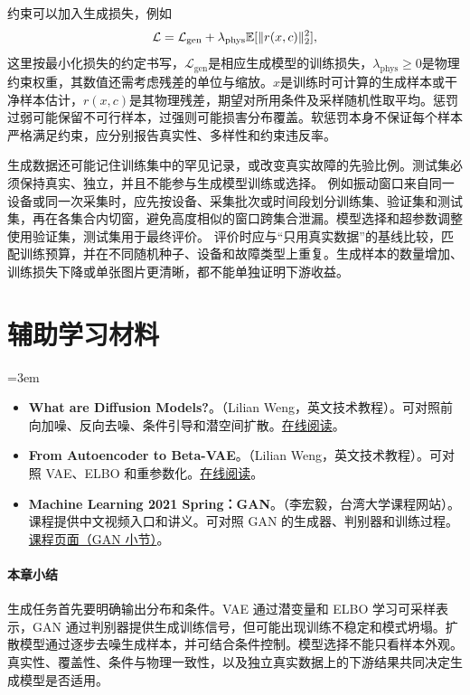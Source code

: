 约束可以加入生成损失，例如
\begin{equation}
\mathcal L=\mathcal L_{\mathrm{gen}}+\lambda_{\mathrm{phys}}\mathbb{E}[\|r(x,c)\|_2^2],
\end{equation}
这里按最小化损失的约定书写，$\mathcal L_{\mathrm{gen}}$是相应生成模型的训练损失，$\lambda_{\mathrm{phys}}\geq0$是物理约束权重，其数值还需考虑残差的单位与缩放。$x$是训练时可计算的生成样本或干净样本估计，$r(x,c)$是其物理残差，期望对所用条件及采样随机性取平均。惩罚过弱可能保留不可行样本，过强则可能损害分布覆盖。软惩罚本身不保证每个样本严格满足约束，应分别报告真实性、多样性和约束违反率。

生成数据还可能记住训练集中的罕见记录，或改变真实故障的先验比例。测试集必须保持真实、独立，并且不能参与生成模型训练或选择。
例如振动窗口来自同一设备或同一次采集时，应先按设备、采集批次或时间段划分训练集、验证集和测试集，再在各集合内切窗，避免高度相似的窗口跨集合泄漏。模型选择和超参数调整使用验证集，测试集用于最终评价。
评价时应与“只用真实数据”的基线比较，匹配训练预算，并在不同随机种子、设备和故障类型上重复。生成样本的数量增加、训练损失下降或单张图片更清晰，都不能单独证明下游收益。

\section*{辅助学习材料}
\begingroup
\emergencystretch=3em
\begin{itemize}
\item \textbf{What are Diffusion Models?}。（Lilian Weng，英文技术教程）。可对照前向加噪、反向去噪、条件引导和潜空间扩散。\href{https://lilianweng.github.io/posts/2021-07-11-diffusion-models/}{在线阅读}。
\item \textbf{From Autoencoder to Beta-VAE}。（Lilian Weng，英文技术教程）。可对照 VAE、ELBO 和重参数化。\href{https://lilianweng.github.io/posts/2018-08-12-vae/}{在线阅读}。
\item \textbf{Machine Learning 2021 Spring：GAN}。（李宏毅，台湾大学课程网站）。课程提供中文视频入口和讲义。可对照 GAN 的生成器、判别器和训练过程。\href{https://speech.ee.ntu.edu.tw/~hylee/ml/2021-spring.php}{课程页面（GAN 小节）}。
\end{itemize}
\endgroup

\paragraph{本章小结}
生成任务首先要明确输出分布和条件。VAE 通过潜变量和 ELBO 学习可采样表示，GAN 通过判别器提供生成训练信号，但可能出现训练不稳定和模式坍塌。扩散模型通过逐步去噪生成样本，并可结合条件控制。模型选择不能只看样本外观。真实性、覆盖性、条件与物理一致性，以及独立真实数据上的下游结果共同决定生成模型是否适用。
